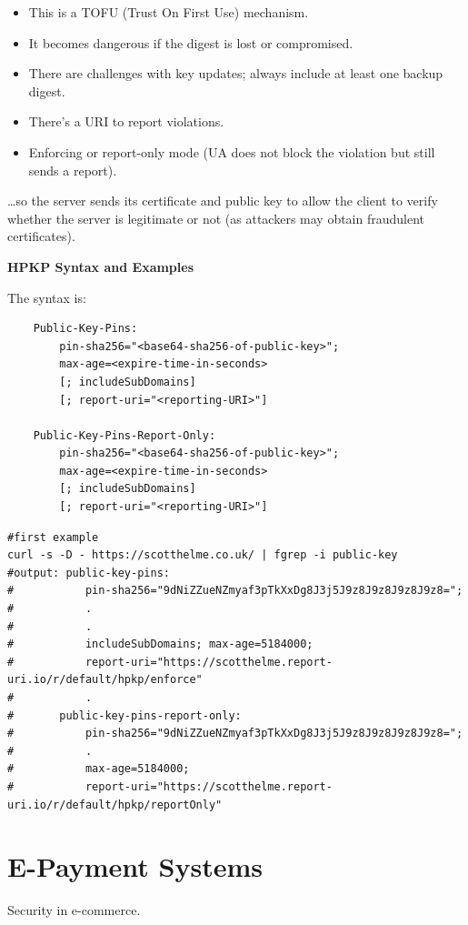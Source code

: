 \begin{itemize}
\item This is a TOFU (Trust On First Use) mechanism.
\item It becomes dangerous if the digest is lost or compromised.
\item There are challenges with key updates; always include at least one backup digest.
\item There's a URI to report violations.
\item Enforcing or report-only mode (UA does not block the violation but still sends a report).
\end{itemize}

…so the server sends its certificate and public key to allow the client to verify whether the server is legitimate or not (as attackers may obtain fraudulent certificates).

\begin{center}
    \textbf{HPKP Syntax and Examples}
\end{center}

The syntax is:
\begin{verbatim}
    Public-Key-Pins:
        pin-sha256="<base64-sha256-of-public-key>";
        max-age=<expire-time-in-seconds>
        [; includeSubDomains]
        [; report-uri="<reporting-URI>"]

    Public-Key-Pins-Report-Only:
        pin-sha256="<base64-sha256-of-public-key>";
        max-age=<expire-time-in-seconds>
        [; includeSubDomains]
        [; report-uri="<reporting-URI>"]
\end{verbatim}

\begin{lstlisting}[style=bashStyle]
#first example
curl -s -D - https://scotthelme.co.uk/ | fgrep -i public-key 
#output: public-key-pins:
#           pin-sha256="9dNiZZueNZmyaf3pTkXxDg8J3j5J9z8J9z8J9z8J9z8=";
#           .
#           .
#           includeSubDomains; max-age=5184000;
#           report-uri="https://scotthelme.report-uri.io/r/default/hpkp/enforce"
#           .
#       public-key-pins-report-only:
#           pin-sha256="9dNiZZueNZmyaf3pTkXxDg8J3j5J9z8J9z8J9z8J9z8=";
#           .
#           max-age=5184000;
#           report-uri="https://scotthelme.report-uri.io/r/default/hpkp/reportOnly"

\end{lstlisting}

\section{E-Payment Systems}
\begin{center}
    Security in e-commerce.
\end{center}

